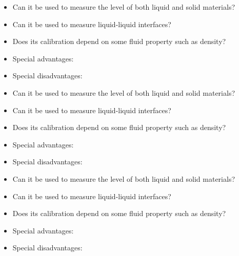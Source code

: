\vskip 10pt

\begin{itemize}
\item{} Can it be used to measure the level of both liquid and solid materials?
\item{} Can it be used to measure liquid-liquid interfaces?
\item{} Does its calibration depend on some fluid property such as density?
\item{} Special advantages:
\item{} Special disadvantages:
\end{itemize}

\begin{comment}
\vskip 10pt

\underbar{\bf Displacer}
\begin{itemize}
\item{} Can it be used to measure the level of both liquid and solid materials?
\item{} Can it be used to measure liquid-liquid interfaces?
\item{} Does its calibration depend on some fluid property such as density?
\item{} Special advantages:
\item{} Special disadvantages:
\end{itemize}
\end{comment}

\vskip 10pt

\begin{itemize}
\item{} Can it be used to measure the level of both liquid and solid materials?
\item{} Can it be used to measure liquid-liquid interfaces?
\item{} Does its calibration depend on some fluid property such as density?
\item{} Special advantages:
\item{} Special disadvantages:
\end{itemize}

\vskip 10pt

\begin{itemize}
\item{} Can it be used to measure the level of both liquid and solid materials?
\item{} Can it be used to measure liquid-liquid interfaces?
\item{} Does its calibration depend on some fluid property such as density?
\item{} Special advantages:
\item{} Special disadvantages:
\end{itemize}

